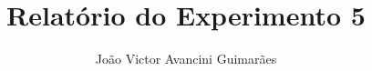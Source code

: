 \title{Relat\' orio do Experimento 5}

\newcommand{\disciplina}{Laborat\' orio de Eletricidade Aplicada}

\author{Jo\~ ao Victor Avancini Guimar\~ aes}

\newcommand{\matricula}{12/0122405}

\newcommand{\professor}{Rudi Van Els}

\date{}
